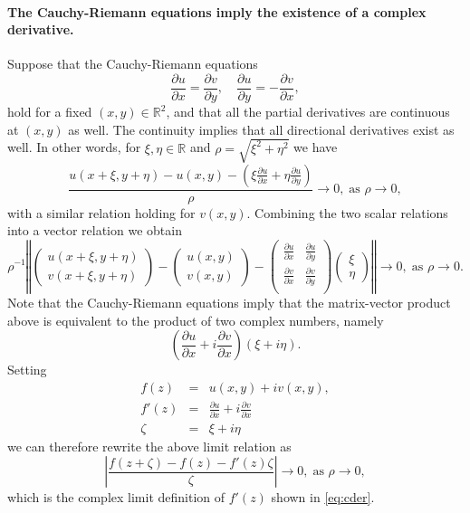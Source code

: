 \documentclass[12pt]{article}
\newcommand{\reals}{\mathbb{R}}
\begin{document}
\paragraph{The Cauchy-Riemann
  equations imply the existence of a complex derivative.}
Suppose that the Cauchy-Riemann
equations 
$$
\frac{\partial u}{\partial x} = \frac{\partial v}{\partial y},\quad
\frac{\partial u}{\partial y} = -\frac{\partial v}{\partial x},
$$
hold for a fixed $(x,y)\in\reals^2$, 
and  that all the
partial derivatives are continuous at $(x,y)$ as well.  The continuity
implies that all directional derivatives exist as well.  In
other words, for $\xi,\eta\in\reals$ and $\rho=\sqrt{\xi^2+\eta^2}$
we have
$$
\frac{
u(x+\xi,y+\eta) - u(x,y) - (\xi \frac{\partial u}{\partial x } + \eta
\frac{\partial u}{\partial y})}{\rho} \rightarrow
0,\;\mbox{as } \rho\rightarrow 0,$$
with a similar relation holding for $v(x,y)$.  Combining the two scalar
relations into a vector relation we obtain
$$
\rho^{-1} \left\Vert
  \begin{pmatrix}
    u(x+\xi,y+\eta) \\ v(x+\xi,y+\eta)
  \end{pmatrix}
  -
  \begin{pmatrix}
    u(x,y) \\ v(x,y)
  \end{pmatrix}
  -
  \begin{pmatrix}
    \frac{\partial u}{\partial x} & \frac{\partial u}{\partial y}\\
    \frac{\partial v}{\partial x} & \frac{\partial v}{\partial y}\\
  \end{pmatrix}
  \begin{pmatrix}
    \xi \\ \eta
  \end{pmatrix}
\right\Vert \rightarrow 0,\;\mbox{as } \rho\rightarrow 0.$$
Note that
the Cauchy-Riemann equations imply that the matrix-vector product
above is equivalent to the product of two complex numbers, namely
$$\left(\frac{\partial u}{\partial x} +i\frac{\partial v}{\partial
  x}\right)(\xi+i\eta).$$
Setting
\begin{eqnarray*}
f(z) &=& u(x,y)+i v(x,y),\\
f'(z) &=& \frac{\partial u}{\partial x} + i\frac{\partial v}{\partial
  x}\\
\zeta &=& \xi+i\eta  
\end{eqnarray*}
we can therefore rewrite the above limit relation  as
$$
\left\vert \frac{ f(z+\zeta)-f(z) - f'(z)\zeta}{ \zeta}\right\vert  \rightarrow
0,\;\mbox{as } \rho\rightarrow 0,$$
which is the complex limit definition of $f'(z)$ shown
in \eqref{eq:cder}.
\end{document}
